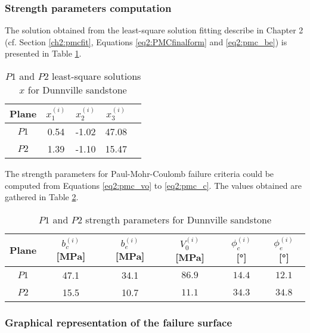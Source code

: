 \subsubsection{Strength parameters computation}

The solution obtained from the least-square solution fitting describe in Chapter 2 (cf. Section \ref{ch2:pmcfit}, Equations \ref{eq2:PMCfinalform} and \ref{eq2:pmc_be}) is presented in Table \ref{tb5:dunn_sol1}. 

\begin{table} [p]
    \centering 
    \begin{tabular}{ccccc}
        \hline 
        Plane & $x_1^{(i)}$ & $x_2^{(i)}$ & $x_3^{(i)}$ \\
        \hline
        \hline
        $P1$ & 0.54 & -1.02 & 47.08 \\
        $P2$ & 1.39 & -1.10 & 15.47 \\
        \hline
    \end{tabular}
    \captionsetup{justification=centering}
    \caption{$P1$ and $P2$ least-square solutions $x$ for Dunnville sandstone}
    \label{tb5:dunn_sol1}
\end{table}

The strength parameters for Paul-Mohr-Coulomb failure criteria could be computed from Equations \ref{eq2:pmc_vo} to \ref{eq2:pmc_c}. The values obtained are gathered in Table \ref{tb5:dunn_strpara}. 

\begin{table} [p]
    \centering 
    \begin{tabular}{cccccc}
        \hline 
        Plane & $b_c^{(i)}$ [\si{MPa}] & $b_e^{(i)}$ [\si{MPa}] & $V_0^{(i)}$ [\si{MPa}] & $\phi_c^{(i)}$ [\si{\degree}] & $\phi_e^{(i)}$ [\si{\degree}] \\
        \hline
        \hline
        $P1$ & 47.1 & 34.1 & $86.9$ & $14.4$ & $12.1$\\
        $P2$ & 15.5 & 10.7 & $11.1$ & $34.3$ & $34.8$ \\
        \hline
    \end{tabular}
    \captionsetup{justification=centering}
    \caption{$P1$ and $P2$ strength parameters for Dunnville sandstone}
    \label{tb5:dunn_strpara}
\end{table}

\subsubsection{Graphical representation of the failure surface}

